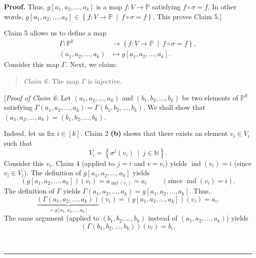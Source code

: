 \documentclass[numbers=enddot,12pt,final,onecolumn,notitlepage]{scrartcl}%
\numberwithin{exer}{section}
\theoremstyle{definition}
\newenvironment{statement}{\begin{quote}}{\end{quote}}
\newenvironment{proof}[1][Proof]{\noindent\textbf{#1.} }{\ \rule{0.5em}{0.5em}}
\newenvironment{verlong}{}{}
\begin{document}
\begin{verlong}
\begin{proof}
Thus, $g\left[  a_{1},a_{2},\ldots,a_{k}\right]  $ is a map $f:V\rightarrow
\mathbb{P}$ satisfying $f\circ\sigma=f$. In other words, $g\left[  a_{1}%
,a_{2},\ldots,a_{k}\right]  \in\left\{  f:V\rightarrow\mathbb{P}\ \mid
\ f\circ\sigma=f\right\}  $. This proves Claim 5.] \medskip

Claim 5 allows us to define a map%
\begin{align*}
\Gamma:\mathbb{P}^{k}  &  \rightarrow\left\{  f:V\rightarrow\mathbb{P}%
\ \mid\ f\circ\sigma=f\right\}  ,\\
\left(  a_{1},a_{2},\ldots,a_{k}\right)   &  \mapsto g\left[  a_{1}%
,a_{2},\ldots,a_{k}\right]  .
\end{align*}
Consider this map $\Gamma$. Next, we claim:

\begin{statement}
\textit{Claim 6:} The map $\Gamma$ is injective.
\end{statement}

[\textit{Proof of Claim 6:} Let $\left(  a_{1},a_{2},\ldots,a_{k}\right)  $
and $\left(  b_{1},b_{2},\ldots,b_{k}\right)  $ be two elements of
$\mathbb{P}^{k}$ satisfying $\Gamma\left(  a_{1},a_{2},\ldots,a_{k}\right)
=\Gamma\left(  b_{1},b_{2},\ldots,b_{k}\right)  $. We shall show that $\left(
a_{1},a_{2},\ldots,a_{k}\right)  =\left(  b_{1},b_{2},\ldots,b_{k}\right)  $.

Indeed, let us fix $i\in\left[  k\right]  $. Claim 2 \textbf{(b)} shows that
there exists an element $v_{i}\in V_{i}$ such that%
\[
V_{i}=\left\{  \sigma^{j}\left(  v_{i}\right)  \ \mid\ j\in\mathbb{N}\right\}
.
\]
Consider this $v_{i}$. Claim 4 (applied to $j=i$ and $v=v_{i}$) yields
$\operatorname*{ind}\left(  v_{i}\right)  =i$ (since $v_{i}\in V_{i}$). The
definition of $g\left[  a_{1},a_{2},\ldots,a_{k}\right]  $ yields%
\[
\left(  g\left[  a_{1},a_{2},\ldots,a_{k}\right]  \right)  \left(
v_{i}\right)  =a_{\operatorname*{ind}\left(  v_{i}\right)  }=a_{i}%
\ \ \ \ \ \ \ \ \ \ \left(  \text{since }\operatorname*{ind}\left(
v_{i}\right)  =i\right)  .
\]
The definition of $\Gamma$ yields $\Gamma\left(  a_{1},a_{2},\ldots
,a_{k}\right)  =g\left[  a_{1},a_{2},\ldots,a_{k}\right]  $. Thus,%
\begin{equation}
\underbrace{\left(  \Gamma\left(  a_{1},a_{2},\ldots,a_{k}\right)  \right)
}_{=g\left[  a_{1},a_{2},\ldots,a_{k}\right]  }\left(  v_{i}\right)  =\left(
g\left[  a_{1},a_{2},\ldots,a_{k}\right]  \right)  \left(  v_{i}\right)
=a_{i}. \label{pf.lem.ptype-as-sum.c6.pf.1}%
\end{equation}
The same argument (applied to $\left(  b_{1},b_{2},\ldots,b_{k}\right)  $
instead of $\left(  a_{1},a_{2},\ldots,a_{k}\right)  $) yields%
\begin{equation}
\left(  \Gamma\left(  b_{1},b_{2},\ldots,b_{k}\right)  \right)  \left(
v_{i}\right)  =b_{i}. \label{pf.lem.ptype-as-sum.c6.pf.2}%
\end{equation}



\end{proof}
\end{verlong}
\end{document}
